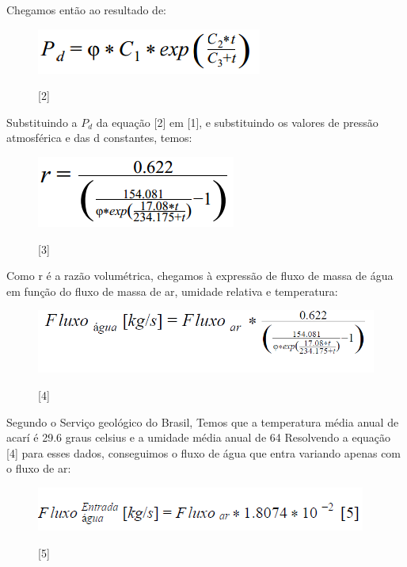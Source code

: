 Chegamos então ao resultado de:
\begin{figure}[!h]
    \centering
    \includegraphics[scale = 1]{editaveis/figuras/eq_1calculo}
    \label{eq1_calculo}
    \caption[Equação Pd]{[2]}
   \end{figure}
   \FloatBarrier
Substituindo a $P_d$ da equação [2] em [1], e substituindo os valores de pressão atmosférica e das d
constantes, temos:
\begin{figure}[!h]
    \centering
    \includegraphics[scale = 1]{editaveis/figuras/razao_volumetrica}
    \label{dados_agua}
    \caption[Razão Volumétrica]{[3]}
   \end{figure}
   \FloatBarrier
Como r é a razão volumétrica, chegamos à expressão de fluxo de massa de água em função do
fluxo de massa de ar, umidade relativa e temperatura:
\begin{figure}[!h]
    \centering
    \includegraphics[scale = 0.6]{editaveis/figuras/fluxo_agua}
    \label{fluxo_agua}
    \caption[Fluxo água]{[4]}
   \end{figure}
   \FloatBarrier
Segundo o Serviço geológico do Brasil\footnotemark, Temos que a temperatura média anual de acarí é 29.6
graus celsius e a umidade média anual de 64%
Resolvendo a equação [4] para esses dados, conseguimos o fluxo de água que entra variando apenas com
o fluxo de ar:
\begin{figure}[!h]
    \centering
    \includegraphics[scale = 1]{editaveis/figuras/fluxo_entrada}
    \label{fluxo_entrada}
    \caption[Fluxo entrada de água]{[5]}
   \end{figure}
   \FloatBarrier
 
